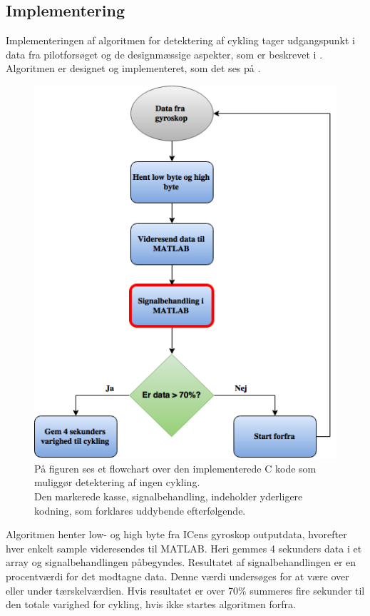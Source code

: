\subsection{Implementering}
Implementeringen af algoritmen for detektering af cykling tager udgangspunkt i data fra pilotforsøget og de designmæssige aspekter, som er beskrevet i . Algoritmen er designet og implementeret, som det ses på .
\begin{figure}[H]
	\centering
	\includegraphics[scale=0.4]{figures/cDesign/Algoritme_cykling_basic.png}
	\caption{På figuren ses et flowchart over den implementerede C kode som muliggør detektering af ingen cykling. \\
Den markerede kasse, signalbehandling, indeholder yderligere kodning, som forklares uddybende efterfølgende.}
	\label{fig:basic_cykling}
\end{figure}
Algoritmen henter low- og high byte fra ICens gyroskop outputdata, hvorefter hver enkelt sample videresendes til MATLAB. Heri gemmes 4 sekunders data i et array og signalbehandlingen påbegyndes. Resultatet af signalbehandlingen er en procentværdi for det modtagne data. Denne værdi undersøges for at være over eller under tærskelværdien. Hvis resultatet er over 70\% summeres fire sekunder til den totale varighed for cykling, hvis ikke startes algoritmen forfra.
